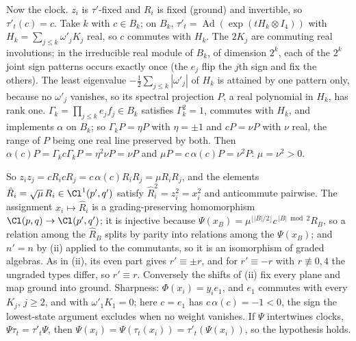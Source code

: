 Now the clock. $z_{i}$ is $\tau'$-fixed and $R_{i}$ is fixed (ground) and invertible, so $\tau'_{t}(c) = c$. Take $k$ with $c \in B_{k}$; on $B_{k}$, $\tau'_{t} = \operatorname{Ad}(\exp(tH_{k} \otimes I_4))$ with $H_{k} = \sum_{j \le k}\omega'_{j}K_{j}$ real, so $c$ commutes with $H_{k}$. The $2K_{j}$ are commuting real involutions; in the irreducible real module of $B_{k}$, of dimension $2^{k}$, each of the $2^{k}$ joint sign patterns occurs exactly once (the $e_{j}$ flip the $j$th sign and fix the others). The least eigenvalue $-\tfrac12\sum_{j \le k}|\omega'_{j}|$ of $H_{k}$ is attained by one pattern only, because no $\omega'_{j}$ vanishes, so its spectral projection $P$, a real polynomial in $H_{k}$, has rank one. $\Gamma_{k} = \prod_{j \le k}e_{j}f_{j} \in B_{k}$ satisfies $\Gamma_{k}^{2} = 1$, commutes with $H_{k}$, and implements $\alpha$ on $B_{k}$; so $\Gamma_{k}P = \eta P$ with $\eta = \pm 1$ and $cP = \nu P$ with $\nu$ real, the range of $P$ being one real line preserved by both. Then $\alpha(c)P = \Gamma_{k}c\Gamma_{k}P = \eta^{2}\nu P = \nu P$ and $\mu P = c\,\alpha(c)P = \nu^{2}P$: $\mu = \nu^{2} > 0$.

So $z_{i}z_{j} = cR_{i}cR_{j} = c\,\alpha(c)R_{i}R_{j} = \mu R_{i}R_{j}$, and the elements $\hat R_{i} = \sqrt{\mu}\,R_{i} \in \Cl^{1}(p',q')$ satisfy $\hat R_{i}^{2} = z_{i}^{2} = x_{i}^{2}$ and anticommute pairwise. The assignment $x_{i} \mapsto \hat R_{i}$ is a grading-preserving homomorphism $\Cl(p,q) \to \Cl(p',q')$; it is injective because $\Psi(x_{B}) = \mu^{\lfloor |B|/2 \rfloor}c^{\,|B| \bmod 2}R_{B}$, so a relation among the $\hat R_{B}$ splits by parity into relations among the $\Psi(x_{B})$; and $n' = n$ by (ii) applied to the commutants, so it is an isomorphism of graded algebras. As in (ii), its even part gives $r' \equiv \pm r$, and for $r' \equiv -r$ with $r \not\equiv 0, 4$ the ungraded types differ, so $r' \equiv r$. Conversely the shifts of (ii) fix every plane and map ground into ground. Sharpness: $\Phi(x_{i}) = y_{i}e_{1}$, and $e_{1}$ commutes with every $K_{j}$, $j \ge 2$, and with $\omega'_{1}K_{1} = 0$; here $c = e_{1}$ has $c\,\alpha(c) = -1 < 0$, the sign the lowest-state argument excludes when no weight vanishes. If $\Psi$ intertwines clocks, $\Psi\tau_{t} = \tau'_{t}\Psi$, then $\Psi(x_{i}) = \Psi(\tau_{t}(x_{i})) = \tau'_{t}(\Psi(x_{i}))$, so the hypothesis holds.

